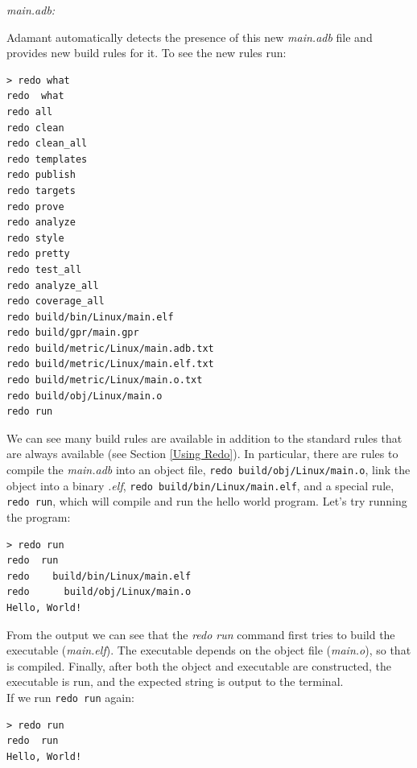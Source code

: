 \textit{main.adb:}

Adamant automatically detects the presence of this new \textit{main.adb} file and provides new build rules for it. To see the new rules run:

\vspace{5mm} %
\begin{verbatim}
> redo what
redo  what
redo all
redo clean
redo clean_all
redo templates
redo publish
redo targets
redo prove
redo analyze
redo style
redo pretty
redo test_all
redo analyze_all
redo coverage_all
redo build/bin/Linux/main.elf
redo build/gpr/main.gpr
redo build/metric/Linux/main.adb.txt
redo build/metric/Linux/main.elf.txt
redo build/metric/Linux/main.o.txt
redo build/obj/Linux/main.o
redo run
\end{verbatim}
\vspace{5mm} %

We can see many build rules are available in addition to the standard rules that are always available (see Section \ref{Using Redo}). In particular, there are rules to compile the \textit{main.adb} into an object file, \texttt{redo build/obj/Linux/main.o}, link the object into a binary \textit{.elf}, \texttt{redo build/bin/Linux/main.elf}, and a special rule, \texttt{redo run}, which will compile and run the hello world program. Let's try running the program:

\vspace{5mm} %
\begin{verbatim}
> redo run
redo  run
redo    build/bin/Linux/main.elf
redo      build/obj/Linux/main.o
Hello, World!
\end{verbatim}
\vspace{5mm} %

From the output we can see that the \textit{redo run} command first tries to build the executable (\textit{main.elf}). The executable depends on the object file (\textit{main.o}), so that is compiled. Finally, after both the object and executable are constructed, the executable is run, and the expected string is output to the terminal. \\

If we run \texttt{redo run} again:

\vspace{5mm} %
\begin{verbatim}
> redo run
redo  run
Hello, World!
\end{verbatim}
\vspace{5mm} %

